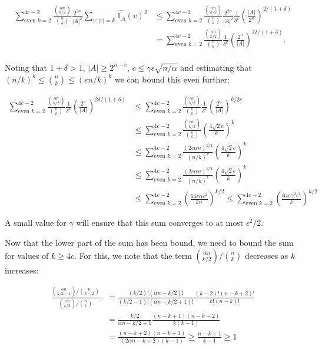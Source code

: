 \documentclass[a4paper]{article}
\begin{document}
        \begin{align*}
            \sum_{\textrm{even }k=2}^{4c - 2}\frac{\binom{\alpha n}{k/2}}{\binom{n}{k}}\frac{2^{2n}}{|A|^2}\sum_{v:|v| = k}\widehat{1_A}(v)^2 &\leq \sum_{\textrm{even }k=2}^{4c-2}\frac{\binom{\alpha n}{k/2}}{\binom{n}{k}}\frac{2^{2n}}{|A|^2}\frac{1}{\delta^k}\left(\frac{|A|}{2^n}\right)^{2/(1 + \delta)}\\
            &= \sum_{\textrm{even }k=2}^{4c - 2}\frac{\binom{\alpha n}{k/2}}{\binom{n}{k}}\frac{1}{\delta^k}\left(\frac{2^n}{|A|}\right)^{2\delta/(1 + \delta)}.\\
        \end{align*}

        Noting that $1 + \delta > 1$, $|A| \geq 2^{n - c}$, $c \leq \gamma \epsilon \sqrt{n/\alpha}$ and estimating that $(n/k)^k \leq \binom{n}{k} \leq (en/k)^k$ we can bound this even further:

        \begin{align*}
            \sum_{\textrm{even }k=2}^{4c - 2}\frac{\binom{\alpha n}{k/2}}{\binom{n}{k}}\frac{1}{\delta^k}\left(\frac{2^n}{|A|}\right)^{2\delta/(1 + \delta)} &\leq \sum_{\textrm{even }k=2}^{4c - 2}\frac{\binom{\alpha n}{k/2}}{\binom{n}{k}}\frac{1}{\delta^k}\left(\frac{2^n}{|A|}\right)^{k/2c}\\
            &\leq \sum_{\textrm{even }k=2}^{4c - 2}\frac{\binom{\alpha n}{k/2}}{\binom{n}{k}}\left(\frac{4\sqrt{2}c}{k}\right)^{k}\\
            &\leq \sum_{\textrm{even }k=2}^{4c - 2}\frac{(2e\alpha n)^{k/2}}{(n/k)^k}\left(\frac{4\sqrt{2}c}{k}\right)^{k}\\
            &\leq \sum_{\textrm{even }k=2}^{4c - 2}\frac{(2e\alpha n)^{k/2}}{(n/k)^k}\left(\frac{4\sqrt{2}c}{k}\right)^{k}\\
            &\leq \sum_{\textrm{even }k=2}^{4c - 2}\left(\frac{64e\alpha c^2}{kn}\right)^{k/2} \leq \sum_{\textrm{even }k=2}^{4c - 2}\left(\frac{64e\gamma^2\epsilon^2}{k}\right)^{k/2}
        \end{align*}

        A small value for $\gamma$ will ensure that this sum converges to at most $\epsilon^2/2$.

        Now that the lower part of the sum has been bound, we need to bound the sum for values of $k \geq 4c$. For this, we note that the term $\binom{\alpha n}{k/2}/\binom{n}{k}$ decreases as $k$ increases:

        \begin{align*}
            \frac{\binom{\alpha n}{k/2 - 1}/\binom{n}{k-2}}{\binom{\alpha n}{k/2}/\binom{n}{k}} &= \frac{(k/2)!(\alpha n - k/2)!}{(k/2 - 1)!(\alpha n - k/2 + 1)!}\frac{(k-2)!(n-k + 2)!}{k!(n-k)!}\\
            &= \frac{k/2}{\alpha n - k/2 + 1}\frac{(n - k + 1)(n - k + 2)}{k(k - 1)}\\
            &= \frac{(n - k + 2)(n - k + 1)}{(2\alpha n - k + 2)(k - 1)} \geq \frac{n - k + 1}{k - 1} \geq 1
        \end{align*}
\end{document}
